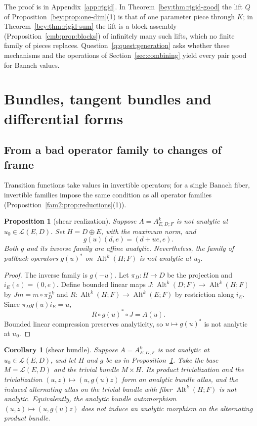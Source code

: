 \documentclass[11pt]{amsart}
\newtheorem{proposition}[theorem]{Proposition}
\newtheorem{corollary}[theorem]{Corollary}
\theoremstyle{definition}
\theoremstyle{remark}
\numberwithin{equation}{section}
\newcommand{\cL}{\mathcal L}
\newcommand{\Alt}{\operatorname{Alt}}
\theoremstyle{plain}
\theoremstyle{definition}
\theoremstyle{plain}
\begin{document}
The proof is in Appendix~\ref{app:rigid}. In Theorem~\ref{bey:thm:rigid-good} the lift $Q$ of
Proposition~\ref{bey:prop:one-dim}(1) is that of one parameter piece through $K$; in Theorem~\ref{bey:thm:rigid-sum}
the lift is a block assembly (Proposition~\ref{cmb:prop:blocks}) of infinitely many such lifts, which no finite family
of pieces replaces. Question~\ref{q:quest:generation} asks whether these mechanisms and the operations of
Section~\ref{sec:combining} yield every pair good for Banach values.
\section{Bundles, tangent bundles and differential forms}\label{sec:geometry}

\subsection{From a bad operator family to changes of frame}

Transition functions take values in invertible operators; for a single Banach fiber, invertible families impose the same condition as all operator families (Proposition~\ref{fam2:prop:reductions}(1)).

\begin{proposition}[shear realization]\label{prop:shear}
Suppose $A=A^k_{E,D;F}$ is not analytic at $u_0\in\cL(E,D)$. Set $H=D\oplus E$, with the maximum norm, and
\[
 g(u)(d,e)=(d+ue,e).
\]
Both $g$ and its inverse family are affine analytic. Nevertheless, the family of pullback operators $g(u)^*$ on $\Alt^k(H;F)$ is not analytic at $u_0$.
\end{proposition}

\begin{proof}
The inverse family is $g(-u)$. Let $\pi_D\colon H\to D$ be the projection and $i_E(e)=(0,e)$. Define bounded linear maps $J\colon\Alt^k(D;F)\to\Alt^k(H;F)$ by $Jm=m\circ\pi_D^{\times k}$ and $R\colon\Alt^k(H;F)\to\Alt^k(E;F)$ by restriction along $i_E$. Since $\pi_Dg(u)i_E=u$,
\begin{equation}\label{eq:shear-compression}
 R\circ g(u)^*\circ J=A(u).
\end{equation}
Bounded linear compression preserves analyticity, so $u\mapsto g(u)^*$ is not analytic at $u_0$.
\end{proof}

\begin{corollary}[shear bundle]\label{cor:shear-bundle}
Suppose $A=A^k_{E,D;F}$ is not analytic at $u_0\in\cL(E,D)$, and let $H$ and $g$ be as in Proposition~\ref{prop:shear}. Take the base $M=\cL(E,D)$ and the trivial bundle $M\times H$. Its product trivialization and the trivialization $(u,z)\mapsto(u,g(u)z)$ form an analytic bundle atlas, and the induced alternating atlas on the trivial bundle with fiber $\Alt^k(H;F)$ is not analytic. Equivalently, the analytic bundle automorphism $(u,z)\mapsto(u,g(u)z)$ does not induce an analytic morphism on the alternating product bundle.
\end{corollary}
\end{document}
